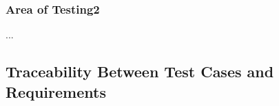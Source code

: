 \documentclass[12pt, titlepage]{article}
\begin{document}
\subsubsection{Area of Testing2}

...

\subsection{Traceability Between Test Cases and Requirements}


		



					
					
					
					
					

					

					
					


\end{document}
